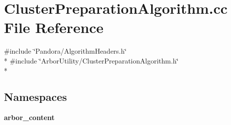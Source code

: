 \section{Cluster\+Preparation\+Algorithm.\+cc File Reference}
\label{ClusterPreparationAlgorithm_8cc}
{\ttfamily \#include \char`\"{}Pandora/\+Algorithm\+Headers.\+h\char`\"{}}\\*
{\ttfamily \#include \char`\"{}Arbor\+Utility/\+Cluster\+Preparation\+Algorithm.\+h\char`\"{}}\\*
\subsection*{Namespaces}
\begin{DoxyCompactItemize}
\item 
 {\bf arbor\+\_\+content}
\end{DoxyCompactItemize}

